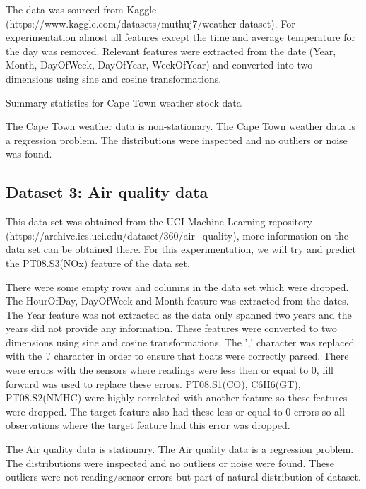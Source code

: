 \documentclass[conference]{IEEEtran}
\begin{document}
The data was sourced from Kaggle (https://www.kaggle.com/datasets/muthuj7/weather-dataset). For experimentation almost all features except the time and average temperature for the day was removed. Relevant features were extracted from the date (Year, Month, DayOfWeek, DayOfYear, WeekOfYear) and converted into two dimensions using sine and cosine transformations.

\begin{table}[htbp]
	\centering
	\caption{Summary statistics for Cape Town weather stock data}
	\scriptsize
	\label{tab:weather-stats}
\end{table}

The Cape Town weather data is non-stationary. The Cape Town weather data is a regression problem. The distributions were inspected and no outliers or noise was found.
 
\subsection{Dataset 3: Air quality data}

This data set was obtained from the UCI Machine Learning repository (https://archive.ics.uci.edu/dataset/360/air+quality), more information on the data set can be obtained there. For this experimentation, we will try and predict the PT08.S3(NOx) feature of the data set.

There were some empty rows and columns in the data set which were dropped. The HourOfDay, DayOfWeek and Month feature was extracted from the dates. The Year feature was not extracted as the data only spanned two years and the years did not provide any information. These features were converted to two dimensions using sine and cosine transformations. The ',' character was replaced with the '.' character in order to ensure that floats were correctly parsed. There were errors with the sensors where readings were less then or equal to 0, fill forward was used to replace these errors. PT08.S1(CO), C6H6(GT), PT08.S2(NMHC) were highly correlated with another feature so these features were dropped. The target feature also had these less or equal to 0 errors so all observations where the target feature had this error was dropped.

The Air quality data is stationary. The Air quality data is a regression problem. The distributions were inspected and no outliers or noise were found. These outliers were not reading/sensor errors but part of natural distribution of dataset.
\end{document}
